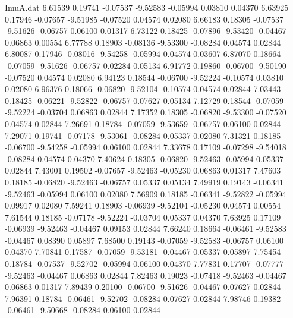 \begin{filecontents}{ImuA.dat}
   6.61539    0.19741   -0.07537   -9.52583   -0.05994    0.03810    0.04370
   6.63925    0.17946   -0.07657   -9.51985   -0.07520    0.04574    0.02080
   6.66183    0.18305   -0.07537   -9.51626   -0.06757    0.06100    0.01317
   6.73122    0.18425   -0.07896   -9.53420   -0.04467    0.06863    0.00554
   6.77788    0.18903   -0.08136   -9.53300   -0.08284    0.04574    0.02844
   6.80087    0.17946   -0.08016   -9.54258   -0.05994    0.04574    0.03607
   6.87070    0.18664   -0.07059   -9.51626   -0.06757    0.02284    0.05134
   6.91772    0.19860   -0.06700   -9.50190   -0.07520    0.04574    0.02080
   6.94123    0.18544   -0.06700   -9.52224   -0.10574    0.03810    0.02080
   6.96376    0.18066   -0.06820   -9.52104   -0.10574    0.04574    0.02844
   7.03443    0.18425   -0.06221   -9.52822   -0.06757    0.07627    0.05134
   7.12729    0.18544   -0.07059   -9.52224   -0.03704    0.06863    0.02844
   7.17352    0.18305   -0.06820   -9.53300   -0.07520    0.04574    0.02844
   7.26691    0.18784   -0.07059   -9.53659   -0.06757    0.06100    0.02844
   7.29071    0.19741   -0.07178   -9.53061   -0.08284    0.05337    0.02080
   7.31321    0.18185   -0.06700   -9.54258   -0.05994    0.06100    0.02844
   7.33678    0.17109   -0.07298   -9.54018   -0.08284    0.04574    0.04370
   7.40624    0.18305   -0.06820   -9.52463   -0.05994    0.05337    0.02844
   7.43001    0.19502   -0.07657   -9.52463   -0.05230    0.06863    0.01317
   7.47603    0.18185   -0.06820   -9.52463   -0.06757    0.05337    0.05134
   7.49919    0.19143   -0.06341   -9.52463   -0.05994    0.06100    0.02080
   7.56909    0.18185   -0.06341   -9.52822   -0.05994    0.09917    0.02080
   7.59241    0.18903   -0.06939   -9.52104   -0.05230    0.04574    0.00554
   7.61544    0.18185   -0.07178   -9.52224   -0.03704    0.05337    0.04370
   7.63925    0.17109   -0.06939   -9.52463   -0.04467    0.09153    0.02844
   7.66240    0.18664   -0.06461   -9.52583   -0.04467    0.08390    0.05897
   7.68500    0.19143   -0.07059   -9.52583   -0.06757    0.06100    0.04370
   7.70841    0.17587   -0.07059   -9.53181   -0.04467    0.05337    0.05897
   7.75454    0.18784   -0.07537   -9.52702   -0.05994    0.06100    0.04370
   7.77831    0.17707   -0.07777   -9.52463   -0.04467    0.06863    0.02844
   7.82463    0.19023   -0.07418   -9.52463   -0.04467    0.06863    0.01317
   7.89439    0.20100   -0.06700   -9.51626   -0.04467    0.07627    0.02844
   7.96391    0.18784   -0.06461   -9.52702   -0.08284    0.07627    0.02844
   7.98746    0.19382   -0.06461   -9.50668   -0.08284    0.06100    0.02844

\end{filecontents}
